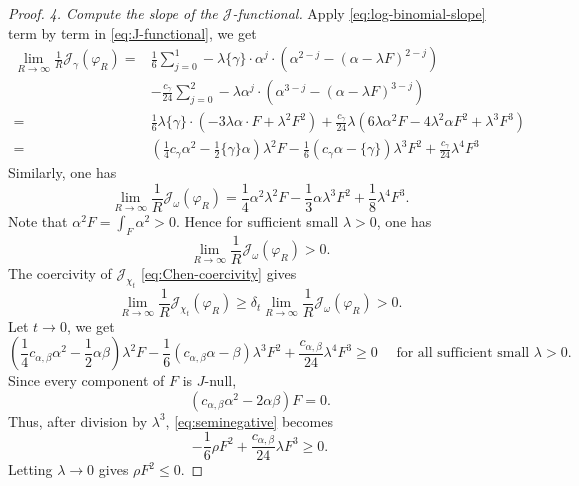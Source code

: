 \documentclass[reqno]{amsart}
\theoremstyle{remark}
\newcommand{\cab}{c_{\alpha,\beta}}
\def\cJ{{\mathcal J}}
\theoremstyle{plain}
\begin{document}
\begin{proof}
\smallskip
\noindent\emph{4. Compute the slope of the $\cJ$-functional.} Apply \eqref{eq:log-binomial-slope} term by term in \eqref{eq:J-functional}, we get \begin{equation}\label{eq:asymptotic-gamma-slope-polynomial}\begin{aligned}
    \lim_{R\to \infty}\frac{1}{R}\cJ_\gamma(\varphi_R)=&\frac{1}{6}\sum_{j=0}^1-\lambda\{\gamma\}\cdot\alpha^j\cdot(\alpha^{2-j}-(\alpha-\lambda F)^{2-j})\\
    &-\frac{c_{\gamma}}{24}\sum_{j=0}^2-\lambda\alpha^j\cdot(\alpha^{3-j}-(\alpha-\lambda F)^{3-j})\\
    =&\frac{1}{6}\lambda\{\gamma\}\cdot(-3\lambda\alpha\cdot F+\lambda^2F^2)+\frac{c_\gamma}{24}\lambda(6\lambda\alpha^2F-4\lambda^2\alpha F^2+\lambda^3F^3)\\
    =&(\frac{1}{4}c_\gamma\alpha^2-\frac{1}{2}\{\gamma\}\alpha)\lambda^2F-\frac{1}{6}(c_\gamma\alpha-\{\gamma\})\lambda^3F^2+\frac{c_\gamma}{24}\lambda^4F^3
\end{aligned}
\end{equation}
Similarly, one has\begin{equation}\label{eq:asymptotic-omega-slope-polynomial}
\lim_{R\rightarrow \infty}\frac{1}{R}\cJ_\omega(\varphi_R)=\frac{1}{4}\alpha^2\lambda^2F-\frac{1}{3}\alpha\lambda^3F^2+\frac{1}{8}\lambda^4F^3. 
\end{equation}
Note that $\alpha^2F=\int_{F}\alpha^2>0$. Hence for sufficient small $\lambda>0$, one has \[
\lim_{R\rightarrow \infty}\frac{1}{R}\cJ_\omega(\varphi_R)>0.
\]
 The coercivity of $\cJ_{\chi_t}$ \eqref{eq:Chen-coercivity}  gives 
 \[
 \lim_{R\to \infty}\frac{1}{R}\cJ_{\chi_t}(\varphi_R)\geq \delta_t\lim_{R\to \infty}\frac{1}{R}\cJ_\omega(\varphi_R)>0.
 \]
 Let $t\rightarrow 0$, we get \begin{equation}
     \label{eq:seminegative}
(\frac14c_{\alpha,\beta}\alpha^2-\frac12\alpha\beta)\lambda^2F
   -\frac16(c_{\alpha,\beta}\alpha-\beta) \lambda^3 F^2
   +\frac{c_{\alpha,\beta}}{24}\lambda^4F^3\ge0 \quad \text{ for all sufficient small }\lambda>0.
  \end{equation}
Since every component of $F$ is $J$-null, \[(
c_{\alpha,\beta}\alpha^2-2\alpha\beta)F=0.
\]
Thus, after division by $\lambda^3$, \eqref{eq:seminegative} becomes \[
-\frac{1}{6}\rho F^2+\frac{\cab}{24}\lambda F^3\geq 0.
\]
Letting $\lambda\to 0$ gives $\rho F^2\leq 0$. 
\end{proof}
\end{document}
